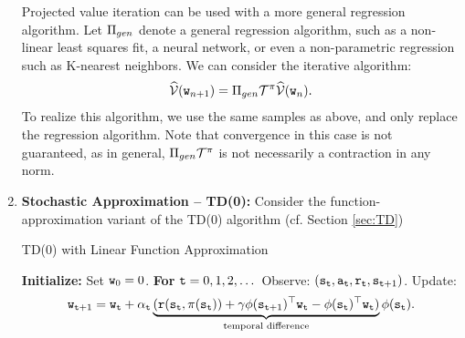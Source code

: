 \begin{enumerate}

\begin{remark}\label{remark:non_linear_PVI}
Projected value iteration can be used with a more general regression algorithm. Let $\Pi_{gen}$ denote a general regression algorithm, such as a non-linear least squares fit, a neural network, or even a non-parametric regression such as K-nearest neighbors. We can consider the iterative algorithm:
$$\widehat{\mathcal{V}}({\tt w}_{n+1}) = \Pi_{gen} \mathcal{T}^\pi \widehat{\mathcal{V}}({\tt w}_{n}).$$
To realize this algorithm, we use the same samples as above, and only replace the regression algorithm. Note that convergence in this case is not guaranteed, as in general, $\Pi_{gen} \mathcal{T}^\pi$ is not necessarily a contraction in any norm.
\end{remark}

\item \textbf{Stochastic Approximation -- TD(0):} Consider the function-approximation variant of the TD(0) algorithm (cf. Section \ref{sec:TD})

\begin{algorithm}[H]
\caption{TD(0) with Linear Function Approximation}
\begin{algorithmic}[1]
\State \textbf{Initialize:} Set ${\tt w}_0 = 0$.
\State \textbf{For} {${\tt t} = 0, 1, 2, \dots$}
    \State \quad Observe: $({\tt s}_{\tt t}, {\tt a}_{\tt t}, {\tt r}_{\tt t}, {\tt s}_{{\tt t}+1})$.
    \State \quad Update:
    \begin{equation}\label{eq:TD_func_approx}
    {\tt w}_{{\tt t}+1} = {\tt w}_{\tt t} + \alpha_{\tt t} \underbrace{( {\tt r}({\tt s}_{\tt t},\pi({\tt s}_{\tt t})) +\gamma {\phi}({\tt s}_{{\tt t}+1})^\top {\tt w}_{\tt t} - {\phi}({\tt s}_{{\tt t}})^\top {\tt w}_{\tt t})}_{\textrm{temporal difference}} \phi({\tt s}_{{\tt t}}).
\end{equation}
\end{algorithmic}
\end{algorithm}


\end{enumerate}
